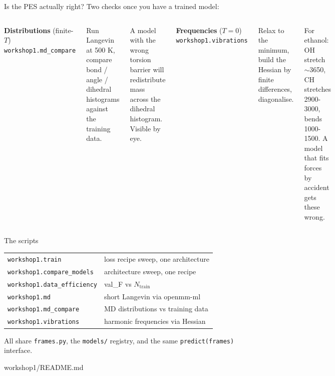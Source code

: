\documentclass[aspectratio=169,11pt]{beamer}
\newcommand{\srcref}[1]{{\color{muted}\ttfamily\footnotesize #1}}
\begin{document}
\begin{frame}{Is the PES actually right?}
  Two checks once you have a trained model:

  \vspace{0.6em}
  \begin{columns}[T]
      \textbf{Distributions} (finite-$T$) \\
      \texttt{workshop1.md\_compare}

      \vspace{0.4em}
      Run Langevin at 500 K, compare bond / angle / dihedral histograms
      against the training data.

      \vspace{0.4em}
      A model with the wrong torsion barrier will redistribute mass
      across the dihedral histogram. Visible by eye.

      \textbf{Frequencies} ($T = 0$) \\
      \texttt{workshop1.vibrations}

      \vspace{0.4em}
      Relax to the minimum, build the Hessian by finite differences,
      diagonalise.

      \vspace{0.4em}
      For ethanol: OH stretch $\sim$3650, CH stretches 2900-3000, bends
      1000-1500. A model that fits forces by accident gets these wrong.
  \end{columns}
\end{frame}

\begin{frame}{The scripts}
  \small
  \begin{tabular}{ll}
    \toprule
    \texttt{workshop1.train}          & loss recipe sweep, one architecture \\
    \texttt{workshop1.compare\_models} & architecture sweep, one recipe \\
    \texttt{workshop1.data\_efficiency} & val\_F vs $N_{\mathrm{train}}$ \\
    \texttt{workshop1.md}              & short Langevin via openmm-ml \\
    \texttt{workshop1.md\_compare}     & MD distributions vs training data \\
    \texttt{workshop1.vibrations}      & harmonic frequencies via Hessian \\
    \bottomrule
  \end{tabular}

  \vspace{0.8em}
  All share \texttt{frames.py}, the \texttt{models/} registry, and the
  same \texttt{predict(frames)} interface.

  \vspace{0.6em}
  \srcref{workshop1/README.md}
\end{frame}
\end{document}
